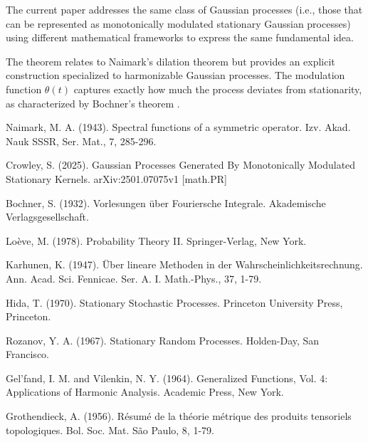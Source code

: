 \documentclass{article}
\theoremstyle{plain}
\theoremstyle{definition}
\begin{document}
The current paper addresses the same class of Gaussian processes (i.e., those that can be represented as monotonically modulated stationary Gaussian processes) using different mathematical frameworks to express the same fundamental idea.

The theorem relates to Naimark's dilation theorem \cite{naimark} but provides an explicit construction specialized to harmonizable Gaussian processes. The modulation function $\theta(t)$ captures exactly how much the process deviates from stationarity, as characterized by Bochner's theorem \cite{bochner}.

\begin{thebibliography}{9}
 Naimark, M. A. (1943). Spectral functions of a symmetric operator. Izv. Akad. Nauk SSSR, Ser. Mat., 7, 285-296.

 Crowley, S. (2025). Gaussian Processes Generated By Monotonically Modulated Stationary Kernels. arXiv:2501.07075v1 [math.PR]

 Bochner, S. (1932). Vorlesungen über Fouriersche Integrale. Akademische Verlagsgesellschaft.

 Loève, M. (1978). Probability Theory II. Springer-Verlag, New York.

 Karhunen, K. (1947). Über lineare Methoden in der Wahrscheinlichkeitsrechnung. Ann. Acad. Sci. Fennicae. Ser. A. I. Math.-Phys., 37, 1-79.

 Hida, T. (1970). Stationary Stochastic Processes. Princeton University Press, Princeton.

 Rozanov, Y. A. (1967). Stationary Random Processes. Holden-Day, San Francisco.

 Gel'fand, I. M. and Vilenkin, N. Y. (1964). Generalized Functions, Vol. 4: Applications of Harmonic Analysis. Academic Press, New York.

 Grothendieck, A. (1956). Résumé de la théorie métrique des produits tensoriels topologiques. Bol. Soc. Mat. São Paulo, 8, 1-79.
\end{thebibliography}
\end{document}
